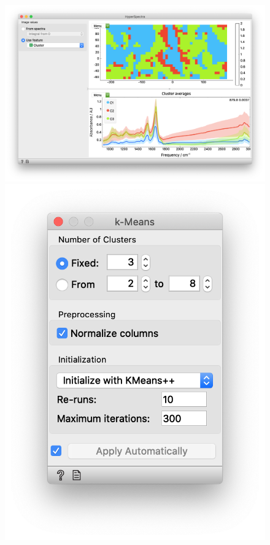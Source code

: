 \begin{figure}[h]
\vspace{-0.5cm}
\hspace{-1cm}
  {\includegraphics[scale=0.25]{graphics/ch-spectra_image_clustering/sp_image_clustering-fig2b.png}}
  {\includegraphics[scale=0.4]{graphics/ch-spectra_image_clustering/sp_image_clustering-fig2a.png}}
  \label{ffig:spectra_image_clustering-fig2}
\end{figure}

